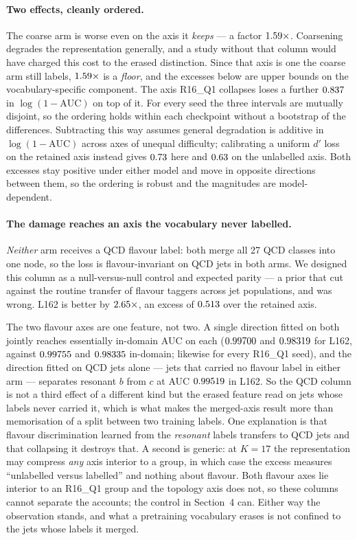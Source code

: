 \documentclass{article}
\begin{document}
\paragraph{Two effects, cleanly ordered.} The coarse arm is worse even on the
axis it \emph{keeps} --- a factor $1.59\times$. Coarsening degrades the
representation generally, and a study without that column would have charged
this cost to the erased distinction. Since that axis is one the coarse arm still
labels, $1.59\times$ is a \emph{floor}, and the excesses below are upper
bounds on the vocabulary-specific component. The axis R16\_Q1 collapses loses a
further
$0.837$ in $\log(1-\mathrm{AUC})$ on top of it. For every seed the three
intervals are mutually disjoint, so the ordering holds within each checkpoint
without a bootstrap of the differences. Subtracting this way assumes general
degradation is additive in $\log(1-\mathrm{AUC})$ across axes of unequal
difficulty; calibrating a uniform $d'$ loss on the retained axis instead gives
$0.73$ here and $0.63$ on the unlabelled axis. Both excesses
stay positive under either model and move in opposite directions between them,
so the ordering is robust and the magnitudes are model-dependent.

\paragraph{The damage reaches an axis the vocabulary never labelled.}
\emph{Neither} arm receives a QCD flavour label: both merge all 27 QCD classes
into one node, so the loss is flavour-invariant on QCD jets in both arms. We
designed this column as a null-versus-null control and expected parity --- a
prior that cut against the routine transfer of flavour taggers across jet
populations, and was wrong. L162 is better by $2.65\times$, an excess of
$0.513$ over the retained axis.

The two flavour axes are one feature, not two. A single direction fitted on
both jointly reaches essentially in-domain AUC on each ($0.99700$ and
$0.98319$ for L162, against $0.99755$ and $0.98335$
in-domain; likewise for every R16\_Q1 seed), and the direction fitted on QCD jets
alone --- jets that carried no flavour label in either arm --- separates resonant
$b$ from $c$ at AUC $0.99519$ in L162. So the QCD column is not a third
effect of a different kind but the erased feature read on jets whose labels never
carried it, which is what makes the merged-axis result more than memorisation of
a split between two training labels. One
explanation is that flavour discrimination learned from the \emph{resonant}
labels transfers to QCD jets and that collapsing it destroys that. A second is
generic: at $K=17$ the representation may compress \emph{any} axis interior to a
group, in which case the excess measures ``unlabelled versus labelled'' and
nothing about flavour. Both flavour axes lie interior to an R16\_Q1 group and the
topology axis does not, so these columns cannot separate the accounts; the
control in Section~4 can. Either way the observation stands, and what a
pretraining vocabulary erases is not confined to the jets whose labels it
merged.
\end{document}
